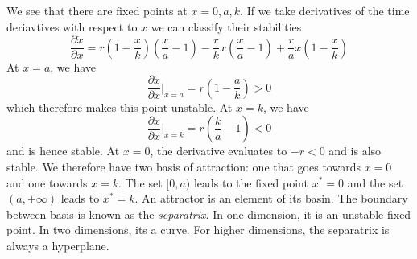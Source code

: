 \documentclass{article}
\newcommand{\pd}[2]{\frac{\partial #1}{\partial #2}}
\theoremstyle{definition}
\begin{document}
We see that there are fixed points at $x=0,a,k$. If we take derivatives of the time deriavtives with respect to $x$ we can classify their stabilities 
\begin{equation*}
    \pd{\dot x}{x} = r\left(1-\frac{x}{k}\right)\left(\frac{x}{a}-1\right)-\frac{r}{k}x\left(\frac{x}{a}-1\right) +\frac{r}{a}x\left(1-\frac{x}{k}\right)
\end{equation*}
At $x=a$, we have 
\begin{equation*}
    \pd{\dot x}{x} \Bigg|_{x=a} =r\left(1-\frac{a}{k}\right) >0 
\end{equation*}
which therefore makes this point unstable. At $x=k$, we have 
\begin{equation*}
    \pd{\dot x}{x} \Bigg|_{x=k} = r\left(\frac{k}{a}-1\right) <0
\end{equation*}
and is hence stable. At $x=0$, the derivative evaluates to $-r<0$ and is also stable. We therefore have two basis of attraction: one that goes towards $x=0$ and one towards $x=k$. The set $[0,a)$ leads to the fixed point $x^*=0$ and the set $(a,+\infty)$ leads to $x^*=k$. An attractor is an element of its basin. The boundary between basis is known as the \emph{separatrix}. In one dimension, it is an unstable fixed point. In two dimensions, its a curve. For higher dimensions, the separatrix is always a hyperplane.
\end{document}
